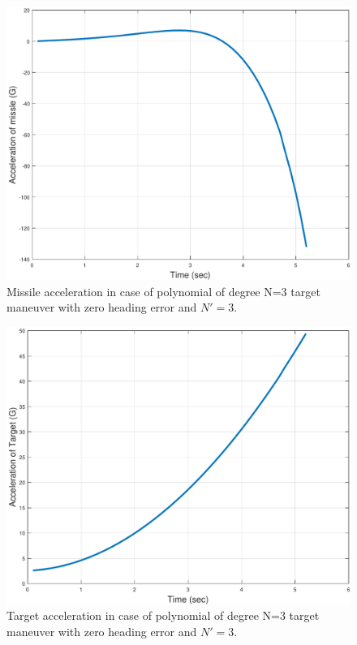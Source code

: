 \begin{figure}[H]
	\centering
	\includegraphics[scale = 0.55]{fig/MissileAccelerationP3N3.pdf}
	\caption{Missile acceleration in case of  polynomial of degree N=3 target maneuver with zero heading error and $N'=3$.}
	\label{missile accelerationP3}
\end{figure}


\begin{figure}[H]
	\centering
	\includegraphics[scale = 0.55]{fig/TargetAccelerationP3N3.pdf}
	\caption{Target acceleration in case of  polynomial of degree N=3 target maneuver with zero heading error and $N'=3$.}
	\label{Target accelerationP3N3}
\end{figure}

